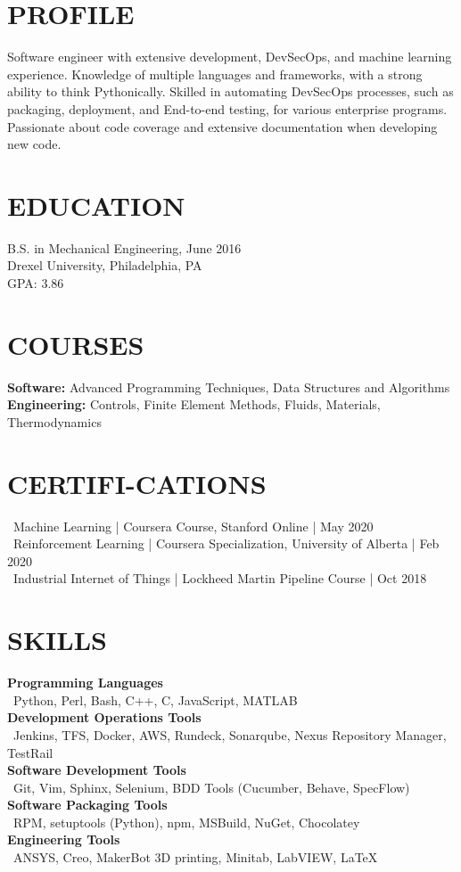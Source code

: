 \documentclass[line,resmargin,11pt]{res}
\begin{document}
\begin{resume}

\section{PROFILE}
Software engineer with extensive development, DevSecOps, and machine learning experience. Knowledge of multiple languages and frameworks, with a strong ability to think Pythonically. Skilled in automating DevSecOps processes, such as packaging, deployment, and End-to-end testing, for various enterprise programs. Passionate about code coverage and extensive documentation when developing new code.

\section{EDUCATION}
B.S. in Mechanical Engineering, June 2016 \\
Drexel University, Philadelphia, PA \\
GPA: 3.86

\section{COURSES}
	\textbf{Software:} Advanced Programming Techniques, Data Structures and Algorithms \\
	\textbf{Engineering:} Controls, Finite Element Methods, Fluids, Materials, Thermodynamics

\section{CERTIFI-CATIONS}
	\textbullet\ Machine Learning | Coursera Course, Stanford Online | May 2020 \\
	\textbullet\ Reinforcement Learning | Coursera Specialization, University of Alberta | Feb 2020 \\
	\textbullet\ Industrial Internet of Things | Lockheed Martin Pipeline Course | Oct 2018

\section{SKILLS}
\textbf{Programming Languages} \\
\textbullet\ Python, Perl, Bash, C++, C, JavaScript, MATLAB  \\
\textbf{Development Operations Tools} \\
\textbullet\ Jenkins, TFS, Docker, AWS, Rundeck, Sonarqube, Nexus Repository Manager, TestRail \\
\textbf{Software Development Tools} \\
\textbullet\ Git, Vim, Sphinx, Selenium, BDD Tools (Cucumber, Behave, SpecFlow) \\
\textbf{Software Packaging Tools} \\
\textbullet\ RPM, setuptools (Python), npm, MSBuild, NuGet, Chocolatey \\
\textbf{Engineering Tools} \\
\textbullet\ ANSYS, Creo, MakerBot 3D printing, Minitab, LabVIEW, \LaTeX          
 

\end{resume}
\end{document}
